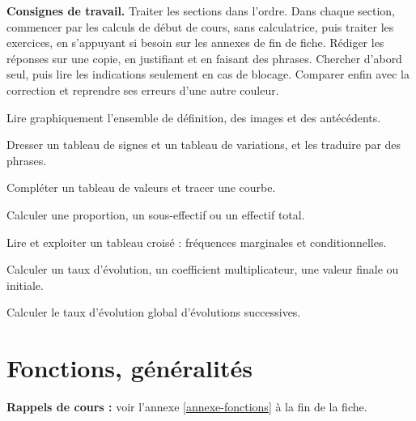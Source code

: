\documentclass[10pt,a4paper]{article}
\begin{document}

\textbf{Consignes de travail.} Traiter les sections dans l'ordre. Dans chaque section, commencer par les calculs de début de cours, sans calculatrice, puis traiter les exercices, en s'appuyant si besoin sur les annexes de fin de fiche. Rédiger les réponses sur une copie, en justifiant et en faisant des phrases. Chercher d'abord seul, puis lire les indications seulement en cas de blocage. Comparer enfin avec la correction et reprendre ses erreurs d'une autre couleur.

\medskip

\begin{objectifs}
Lire graphiquement l'ensemble de définition, des images et des antécédents.\par\smallskip
Dresser un tableau de signes et un tableau de variations, et les traduire par des phrases.\par\smallskip
Compléter un tableau de valeurs et tracer une courbe.\par\smallskip
Calculer une proportion, un sous-effectif ou un effectif total.\par\smallskip
Lire et exploiter un tableau croisé : fréquences marginales et conditionnelles.\par\smallskip
Calculer un taux d'évolution, un coefficient multiplicateur, une valeur finale ou initiale.\par\smallskip
Calculer le taux d'évolution global d'évolutions successives.
\end{objectifs}


\section{Fonctions, généralités}

\textbf{Rappels de cours :} voir l'annexe \ref{annexe-fonctions} à la fin de la fiche.
\nopagebreak
\end{document}

